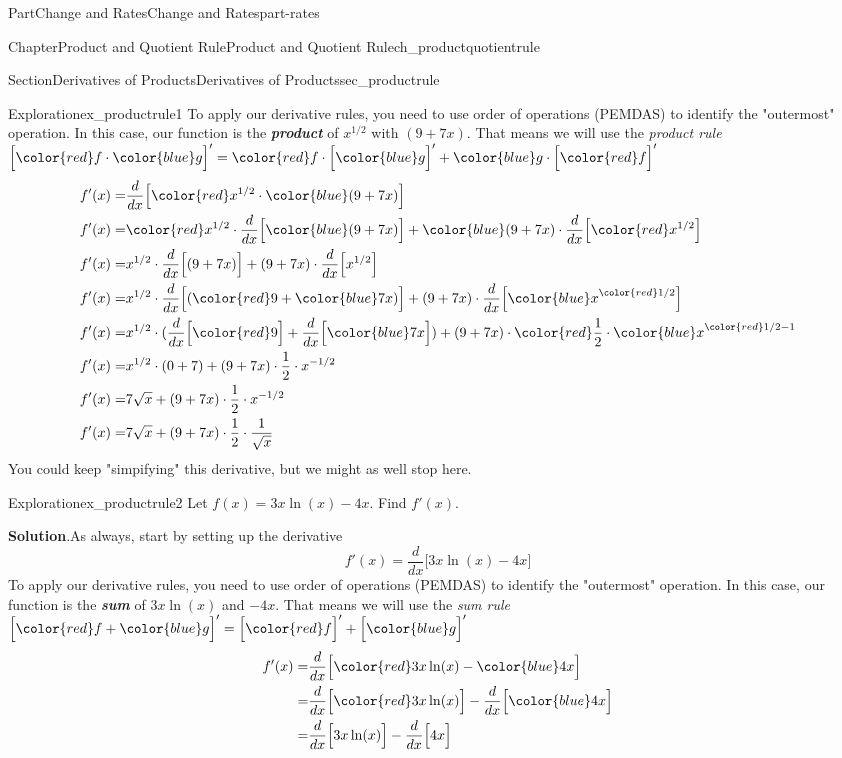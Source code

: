 \documentclass[oneside,10pt,]{tufte-book}
\newcommand{\blocktitlefont}{\relax}
\newcommand{\alert}[1]{\textbf{\textit{#1}}}
\numberwithin{equation}{chapter}
\newcommand{\red}[1]{   {\color{red}   #1}   }
\newcommand{\blue}[1]{  {\color{blue}  #1}  }
\newcommand{\ddx}[1]{ \dfrac{d}{dx} \Big[ #1 \Big]  }
\newcommand{\D}[1]{ \Big[ #1 \Big]'  }
\newcommand{\amp}{&}
\begin{document}
\begin{partptx}{Part}{Change and Rates}{}{Change and Rates}{}{}{part-rates}
\begin{chapterptx}{Chapter}{Product and Quotient Rule}{}{Product and Quotient Rule}{}{}{ch_productquotientrule}
\begin{sectionptx}{Section}{Derivatives of Products}{}{Derivatives of Products}{}{}{sec_productrule}
\begin{exploration}{Exploration}{}{ex_productrule1}
To apply our derivative rules, you need to use order of operations (PEMDAS) to identify the "outermost" operation. In this case, our function is the \alert{product} of \(x^{1/2}\) with \((9+7x)\).  That means we will use the \emph{product rule} \(\D{\red{f}\cdot \blue{g}} = \red{f}\cdot \D{\blue{g}} + \blue{g}\cdot \D{\red{f}}\)%
\begin{align*}
f'(x)  = \amp \ddx{ \red{x^{1/2}} \cdot \blue{(9 + 7x)} } \\
f'(x)  = \amp \red{x^{1/2}} \cdot \ddx{ \blue{(9 + 7x)} } + \blue{(9 + 7x)} \cdot \ddx{ \red{x^{1/2}} } \\
f'(x)  = \amp x^{1/2} \cdot \ddx{ (9 + 7x) } + (9 + 7x) \cdot \ddx{ x^{1/2} } \\
f'(x)  = \amp x^{1/2} \cdot \ddx{ (\red{9} + \blue{7x}) } + (9 + 7x) \cdot \ddx{ \blue{x}^{\red{1/2}} } \\
f'(x)  = \amp x^{1/2} \cdot (\ddx{\red{9}} + \ddx{\blue{7x}})  + (9 + 7x) \cdot \red{\frac{1}{2}}\cdot \blue{x}^{\red{1/2}-1}  \\
f'(x)  = \amp x^{1/2} \cdot (0 + 7)  + (9 + 7x) \cdot \frac{1}{2} \cdot x^{-1/2}  \\
f'(x)  = \amp 7\sqrt{x}  + (9 + 7x) \cdot \frac{1}{2} \cdot x^{-1/2}  \\
f'(x)  = \amp 7\sqrt{x}  + (9 + 7x) \cdot \frac{1}{2} \cdot \frac{1}{\sqrt{x}} 
\end{align*}
You could keep "simpifying" this derivative, but we might as well stop here.%
\end{exploration}%
\begin{exploration}{Exploration}{}{ex_productrule2}%
Let \(f(x) = 3x\ln(x) - 4x\). Find \(f'(x)\).%
\par\smallskip%
\noindent\textbf{\blocktitlefont Solution}.\hypertarget{ex_productrule2-2}{}\quad{}As always, start by setting up the derivative%
\begin{equation*}
f'(x) = \ddx{3x\ln(x) - 4x} 
\end{equation*}
To apply our derivative rules, you need to use order of operations (PEMDAS) to identify the "outermost" operation. In this case, our function is the \alert{sum} of \(3x\ln(x)\) and  \(-4x\).  That means we will use the \emph{sum rule} \(\D{\red{f} + \blue{g}} = \D{\red{f}} + \D{\blue{g}}\)%
\begin{align*}
f'(x) = \amp \ddx{ \red{3x\ln(x)} - \blue{4x}  } \\
= \amp \ddx{ \red{3x\ln(x)} } - \ddx{\blue{4x}  } \\
= \amp \ddx{ 3x\ln(x) } - \ddx{ 4x  } 

\end{align*}
\end{exploration}
\end{sectionptx}
\end{chapterptx}
\end{partptx}
\end{document}
